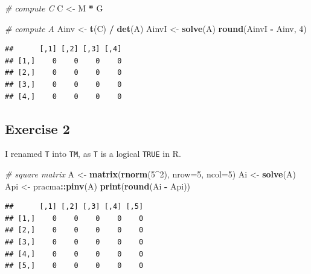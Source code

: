 \documentclass[
]{book}
\newenvironment{Shaded}{\begin{snugshade}}{\end{snugshade}}
\newcommand{\CommentTok}[1]{\textcolor[rgb]{0.56,0.35,0.01}{\textit{#1}}}
\newcommand{\DataTypeTok}[1]{\textcolor[rgb]{0.13,0.29,0.53}{#1}}
\newcommand{\DecValTok}[1]{\textcolor[rgb]{0.00,0.00,0.81}{#1}}
\newcommand{\KeywordTok}[1]{\textcolor[rgb]{0.13,0.29,0.53}{\textbf{#1}}}
\newcommand{\NormalTok}[1]{#1}
\newcommand{\OperatorTok}[1]{\textcolor[rgb]{0.81,0.36,0.00}{\textbf{#1}}}
\newcommand{\StringTok}[1]{\textcolor[rgb]{0.31,0.60,0.02}{#1}}
\begin{document}
\begin{Shaded}
\begin{Highlighting}[]
\CommentTok{\# compute C}
\NormalTok{C \textless{}{-}}\StringTok{ }\NormalTok{M }\OperatorTok{*}\StringTok{ }\NormalTok{G}

\CommentTok{\# compute A}
\NormalTok{Ainv \textless{}{-}}\StringTok{ }\KeywordTok{t}\NormalTok{(C) }\OperatorTok{/}\StringTok{ }\KeywordTok{det}\NormalTok{(A)}
\NormalTok{AinvI \textless{}{-}}\StringTok{ }\KeywordTok{solve}\NormalTok{(A)}
\KeywordTok{round}\NormalTok{(AinvI }\OperatorTok{{-}}\StringTok{ }\NormalTok{Ainv, }\DecValTok{4}\NormalTok{)}
\end{Highlighting}
\end{Shaded}

\begin{verbatim}
##      [,1] [,2] [,3] [,4]
## [1,]    0    0    0    0
## [2,]    0    0    0    0
## [3,]    0    0    0    0
## [4,]    0    0    0    0
\end{verbatim}

\hypertarget{exercise-2-8}{%
\subsection*{Exercise 2}\label{exercise-2-8}}

I renamed \texttt{T} into \texttt{TM}, as \texttt{T} is a logical \texttt{TRUE} in R.

\begin{Shaded}
\begin{Highlighting}[]
\CommentTok{\# square matrix}
\NormalTok{A \textless{}{-}}\StringTok{ }\KeywordTok{matrix}\NormalTok{(}\KeywordTok{rnorm}\NormalTok{(}\DecValTok{5}\OperatorTok{\^{}}\DecValTok{2}\NormalTok{), }\DataTypeTok{nrow=}\DecValTok{5}\NormalTok{, }\DataTypeTok{ncol=}\DecValTok{5}\NormalTok{)}
\NormalTok{Ai \textless{}{-}}\StringTok{ }\KeywordTok{solve}\NormalTok{(A)}
\NormalTok{Api \textless{}{-}}\StringTok{ }\NormalTok{pracma}\OperatorTok{::}\KeywordTok{pinv}\NormalTok{(A)}
\KeywordTok{print}\NormalTok{(}\KeywordTok{round}\NormalTok{(Ai }\OperatorTok{{-}}\StringTok{ }\NormalTok{Api))}
\end{Highlighting}
\end{Shaded}

\begin{verbatim}
##      [,1] [,2] [,3] [,4] [,5]
## [1,]    0    0    0    0    0
## [2,]    0    0    0    0    0
## [3,]    0    0    0    0    0
## [4,]    0    0    0    0    0
## [5,]    0    0    0    0    0
\end{verbatim}
\end{document}
